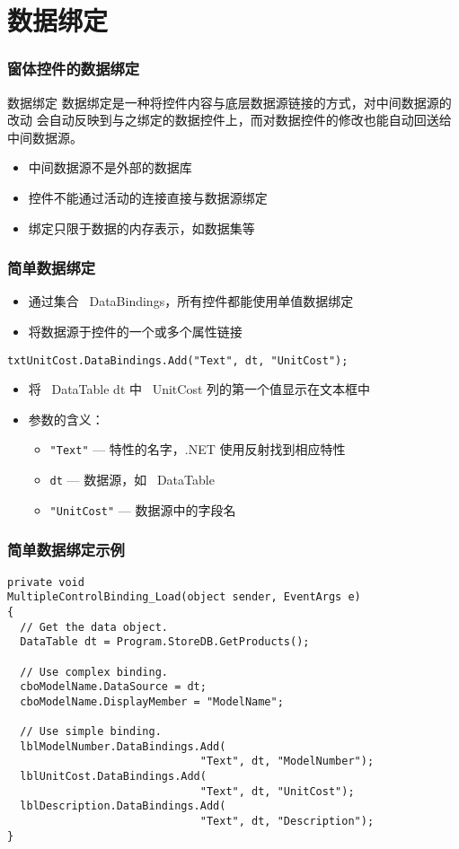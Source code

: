 \section{数据绑定}

\begin{frame}
\frametitle{窗体控件的数据绑定}
\begin{block}{数据绑定}
  \CJKindent 数据绑定是一种将控件内容与底层数据源链接的方式，对中间数据源的改动
  会自动反映到与之绑定的数据控件上，而对数据控件的修改也能自动回送给中间数据源。
\end{block}
\begin{itemize}
\setlength{\itemsep}{8pt plus 1pt}
\item 中间数据源不是外部的数据库
\item 控件不能通过活动的连接直接与数据源绑定
\item 绑定只限于数据的内存表示，如数据集等
\end{itemize}
\end{frame}

\begin{frame}[fragile]
\frametitle{简单数据绑定}
\begin{itemize}
\item 通过集合 ~DataBindings，所有控件都能使用单值数据绑定
\item 将数据源于控件的一个或多个属性链接
\end{itemize}
\begin{lstlisting}
txtUnitCost.DataBindings.Add("Text", dt, "UnitCost");
\end{lstlisting}
\begin{itemize}
\item 将 ~DataTable dt 中 ~UnitCost 列的第一个值显示在文本框中
\item 参数的含义：
\begin{itemize}
  \item \verb|"Text"| --- 特性的名字，.NET 使用反射找到相应特性
  \item \verb|dt| --- 数据源，如 ~DataTable
  \item \verb|"UnitCost"| --- 数据源中的字段名
  \end{itemize}
\end{itemize}
\end{frame}

\begin{frame}[fragile]
\frametitle{简单数据绑定示例}
\begin{lstlisting}
private void
MultipleControlBinding_Load(object sender, EventArgs e)
{
  // Get the data object.
  DataTable dt = Program.StoreDB.GetProducts();

  // Use complex binding.
  cboModelName.DataSource = dt;
  cboModelName.DisplayMember = "ModelName";

  // Use simple binding.
  lblModelNumber.DataBindings.Add(
                              "Text", dt, "ModelNumber");
  lblUnitCost.DataBindings.Add(
                              "Text", dt, "UnitCost");
  lblDescription.DataBindings.Add(
                              "Text", dt, "Description");
}
\end{lstlisting}
\end{frame}

